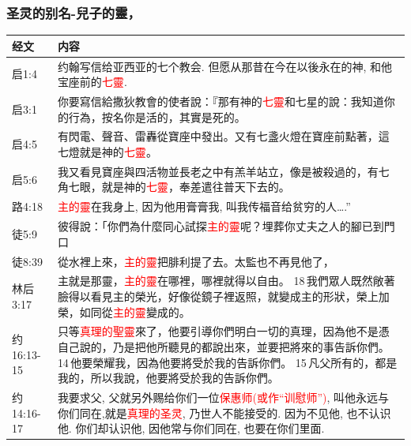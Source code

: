 \subsubsection{圣灵的别名-兒子的靈，}
\begin{table}[H]
  \centering
  \begin{tabular}{p{6em}|p{42em}}  \toprule
经文&内容\\  \midrule

启1:4&约翰写信给亚西亚的七个教会. 但愿从那昔在今在以後永在的神, 和他宝座前的\textcolor{red}{七靈}.\\  \midrule
启3:1&你要寫信給撒狄教會的使者說：『那有神的\textcolor{red}{七靈}和七星的說：我知道你的行為，按名你是活的，其實是死的。\\  \midrule
启4:5&有閃電、聲音、雷轟從寶座中發出。又有七盞火燈在寶座前點著，這七燈就是神的\textcolor{red}{七靈}。\\  \midrule
启5:6&我又看見寶座與四活物並長老之中有羔羊站立，像是被殺過的，有七角七眼，就是神的\textcolor{red}{七靈}，奉差遣往普天下去的。\\  \midrule

路4:18&\textcolor{red}{主的靈}在我身上, 因为他用膏膏我, 叫我传福音给贫穷的人….”\\  \midrule
 
徒5:9&彼得說：「你們為什麼同心試探\textcolor{red}{主的靈}呢？埋葬你丈夫之人的腳已到門口\\  \midrule
徒8:39&從水裡上來，\textcolor{red}{主的靈}把腓利提了去。太監也不再見他了，\\  \midrule
林后3:17&主就是那靈，\textcolor{red}{主的靈}在哪裡，哪裡就得以自由。 18 我們眾人既然敞著臉得以看見主的榮光，好像從鏡子裡返照，就變成主的形狀，榮上加榮，如同從\textcolor{red}{主的靈}變成的。\\  \midrule


约16:13-15&只等\textcolor{red}{真理的聖靈}來了，他要引導你們明白一切的真理，因為他不是憑自己說的，乃是把他所聽見的都說出來，並要把將來的事告訴你們。 14 他要榮耀我，因為他要將受於我的告訴你們。 15 凡父所有的，都是我的，所以我說，他要將受於我的告訴你們。\\  \midrule
约14:16-17&我要求父, 父就另外赐给你们一位\textcolor{red}{保惠师(或作“训慰师”)}, 叫他永远与你们同在,就是\textcolor{red}{真理的圣灵}, 乃世人不能接受的. 因为不见他, 也不认识他. 你们却认识他, 因他常与你们同在, 也要在你们里面.\\  \midrule



\end{tabular}
\end{table}

